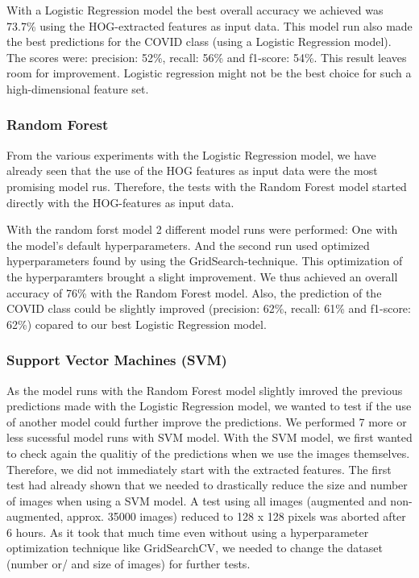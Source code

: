 \documentclass{article}
\begin{document}
With a Logistic Regression model the best overall accuracy we achieved was 73.7\% using the HOG-extracted features as input data. This model run also made the best predictions for the COVID class (using a Logistic Regression model). The scores were:  precision: 52\%, recall: 56\% and f1-score: 54\%. This result leaves room for improvement. Logistic regression might not be the best choice for such a high-dimensional feature set.\\



\subsubsection{Random Forest}
From the various experiments with the Logistic Regression model, we have already seen that the use of the HOG features as input data were the most promising model rus. Therefore, the tests with the Random Forest model started directly with the HOG-features as input data. 

With the random forst model 2 different model runs were performed: One with the model's default hyperparameters. And the second run used optimized hyperparameters found by using the GridSearch-technique. This optimization of the hyperparamters brought a slight improvement. We thus achieved an overall accuracy of 76\% with the Random Forest model. Also, the prediction of the COVID class could be slightly improved (precision: 62\%, recall: 61\% and f1-score: 62\%) copared to our best Logistic Regression model.


\subsubsection{Support Vector Machines (SVM)}
As the model runs with the Random Forest model slightly imroved the previous predictions made with the Logistic Regression model, we wanted to test if the use of another model could further improve the predictions. We performed 7 more or less sucessful model runs with SVM model. 
With the SVM model, we first wanted to check again the qualitiy of the predictions when we use the images themselves. Therefore, we did not immediately start with the extracted features. The first test had already shown that we needed to drastically reduce the size and number of images when using a SVM model. A test using all images (augmented and non-augmented, approx. 35000 images) reduced to 128 x 128 pixels was aborted after 6 hours. As it took that much time even without using a hyperparameter optimization technique like GridSearchCV, we needed to change the dataset (number or/ and size of images) for further tests. 
\end{document}

